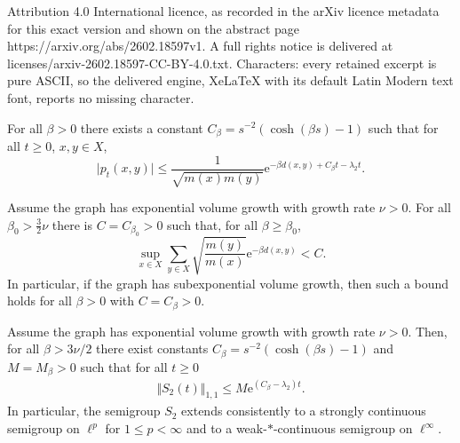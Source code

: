 \documentclass[10pt,a4paper]{amsart}
\begin{document}
Attribution 4.0 International licence, as recorded in the arXiv licence metadata for this exact version and shown on the abstract page https://arxiv.org/abs/2602.18597v1. A full rights notice is delivered at licenses/arxiv-2602.18597-CC-BY-4.0.txt. Characters: every retained excerpt is pure ASCII, so the delivered engine, XeLaTeX with its default Latin Modern text font, reports no missing character.
\begin{corollary}\label{DGGCorollary}
  For all $\beta>0$ there exists a constant $C_\beta = s^{-2}(\cosh(\beta s)-1)$ such that for all $t\geq 0$, $x,y\in X$,
    \[\vert p_t(x,y)\vert\leq \frac{1}{\sqrt{m(x)m(y)}}\mathrm{e}^{-\beta d(x,y)+C_\beta t-\lambda_2t}.\]
\end{corollary}

\begin{lemma}\label{LemmaVolGrowth}
    Assume the graph  has exponential volume growth with growth rate $\nu>0$. For all  $\beta_0>\frac{3}{2}\nu$  there is $C=C_{\beta_0}>0$ such that, for all $\beta\geq\beta_0$,
    \[\sup_{x\in X}\sum_{y\in X}\sqrt{\frac{m(y)}{m(x)}}\mathrm{e}^{-\beta d(x,y)}<C.\]
    In particular, if the graph has subexponential volume growth, then such a bound holds for all $\beta>0$ with $C=C_\beta>0$.
\end{lemma}

\begin{theorem}\label{lpextend}
    Assume the graph   has exponential volume growth with growth rate $\nu>0$. Then,    for all $\beta>3\nu\slash 2$ there exist constants
     $C_\beta = s^{-2}(\cosh(\beta s)-1)$ and $M=M_\beta>0$ such that for all $t\geq 0$  
\begin{align*}
        \Vert S_2(t) \Vert_{1,1} \leq M\mathrm{e}^{(C_\beta-\lambda_2) t}.
    \end{align*}
In particular,
    the semigroup $S_2$ extends consistently to a strongly continuous semigroup  on $\ell^p$ for $1\leq p<\infty$ and to a weak-$\ast$-continuous semigroup on $\ell^\infty.$ 
\end{theorem}
\end{document}

